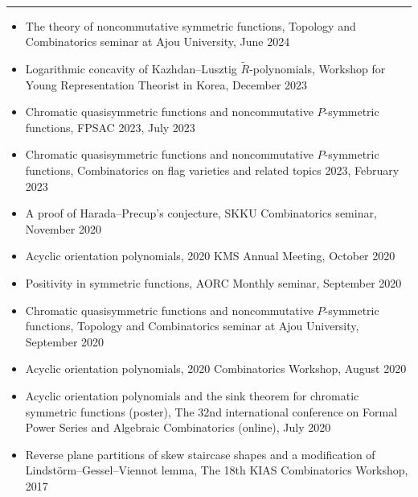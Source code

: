 \documentclass[letterpaper,11pt]{article}
\newcommand{\resheading}[1]{
	\vspace{5pt}
	\textbf{\sffamily{\mbox{~}\makebox[6.762in][l]{\large #1} \vphantom{p\^{E}}}} \\[-6pt]
	\par\noindent\rule{\textwidth}{0.4pt}
}
\begin{document}
\resheading{Presentations}
\begin{itemize}
  \item The theory of noncommutative symmetric functions, Topology and Combinatorics seminar at Ajou University, June 2024
  
  \item Logarithmic concavity of Kazhdan--Lusztig \( \widetilde{R} \)-polynomials, Workshop for Young Representation Theorist in Korea, December 2023

  \item Chromatic quasisymmetric functions and noncommutative $P$-symmetric functions, FPSAC 2023, July 2023
  
  \item Chromatic quasisymmetric functions and noncommutative $P$-symmetric functions, Combinatorics on flag varieties and related topics 2023, February 2023
  
  \item A proof of Harada--Precup's conjecture, SKKU Combinatorics seminar, November 2020

  \item Acyclic orientation polynomials, 2020 KMS Annual Meeting, October 2020

  \item Positivity in symmetric functions, AORC Monthly seminar, September 2020
  
  \item Chromatic quasisymmetric functions and noncommutative $P$-symmetric functions, Topology and Combinatorics seminar at Ajou University, September 2020

  \item Acyclic orientation polynomials, 2020 Combinatorics Workshop, August 2020

  \item Acyclic orientation polynomials and the sink theorem for chromatic symmetric functions (poster), The 32nd international conference on Formal Power Series and Algebraic Combinatorics (online), July 2020

  \item Reverse plane partitions of skew staircase shapes and a modification of Lindst\"orm--Gessel--Viennot lemma, The 18th KIAS Combinatorics Workshop, 2017
\end{itemize}


\end{document}
